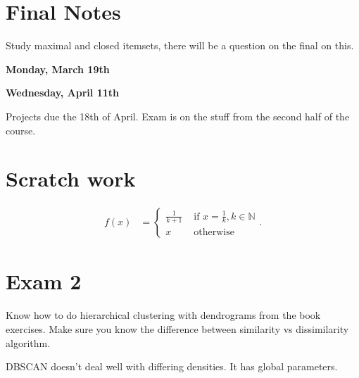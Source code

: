 \documentclass{amsbook}
\theoremstyle{plain}
\numberwithin{section}{chapter}
\numberwithin{equation}{chapter}
\theoremstyle{definition}
\theoremstyle{remark}
\newcommand{\n}{\mathbb{N}}
\newcommand{\bee}{\begin{equation}\begin{aligned}}
\newcommand{\eee}{\end{aligned}\end{equation}}
\newcommand{\fracc}{\frac}
\begin{document}
\section{Final Notes}

Study maximal and closed itemsets, there will be a question on the final on this. 


\textbf{Monday, March 19th}



\textbf{Wednesday, April 11th}

Projects due the 18th of April. Exam is on the stuff from the second half of the course. 


\section{Scratch work}


\bee
f(x) &= \begin{cases}
\fracc{1}{k + 1} & \text{ if }x = \fracc{1}{k}, k \in \n\\
x & \text{ otherwise}
\end{cases}. 
\eee




\section{Exam 2}

Know how to do hierarchical clustering with dendrograms from the book exercises. Make sure you know the difference between similarity vs dissimilarity algorithm. 


DBSCAN doesn't deal well with differing densities. It has global parameters. 




















\appendix
%

\backmatter


\printindex
\end{document}
